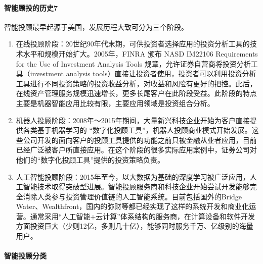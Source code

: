 \documentclass[letterpaper,11pt,english]{sphinxmanual}
\begin{document}
\begin{center}
{{\paragraph{智能顾投的历史7\sphinxfootnotemark[958]}
\label{\detokenize{chapter_AI+Finance/Robo-Advisor:id4}}%
\begin{footnotetext}[958]\sphinxAtStartFootnote
{}
%
\end{footnotetext}\ignorespaces 
智能投顾最早起源于美国，发展历程大致可分为三个阶段。
\begin{enumerate}
%
\item {} 
在线投顾阶段：20世纪90年代末期，可供投资者选择应用的投资分析工具的技术水平和规模开始扩大。2005年，FINRA
颁布 NASD IM2210\sphinxhyphen{}6 Requirements for the Use of Investment Analysis
Tools 规章，允许证券自营商将投资分析工具（investment analysis
tools）直接让投资者使用，投资者可以利用投资分析工具进行不同投资策略的投资收益分析，对收益和风险有更好的把控。此后，在线资产管理服务规模迅速增长，更多长尾客户在此阶段受益。此阶段的特点主要是机器智能应用比较有限，主要应用领域是投资组合分析。

\item {} 
机器人投顾阶段：2008年～2015年期间，大量新兴科技企业开始为客户直接提供各类基于机器学习的
“数字化投顾工具”，机器人投顾商业模式开始发展。这些公司开发的面向客户的投顾工具提供的功能之前只被金融从业者应用，目前已经广泛被客户所直接应用。在这个阶段的很多实际应用案例中，证券公司对他们的“数字化投顾工具”提供的投资策略负责。

\item {} 
人工智能投顾阶段：2015年至今，以大数据为基础的深度学习被广泛应用，人工智能技术取得突破型进展。智能投顾服务商和科技企业开始尝试开发能够完全消除人类参与投资管理价值链的人工智能系统。目前包括国外的Bridge
Water、Wealthfront，国内的弥财等都已经实现了这样的系统开发和商业化运营。通常采用“人工智能+云计算”体系结构的服务商，在计算设备和软件开发方面投资巨大（少则1\sphinxhyphen{}2亿，多则几十亿），能够同时服务千万、亿级别的海量用户。%
\begin{footnote}[959]\sphinxAtStartFootnote
{}
%
\end{footnote}

\end{enumerate}


\paragraph{智能投顾分类}
\label{\detokenize{chapter_AI+Finance/Robo-Advisor:id5}}
\begin{figure}[H]
\centering
\capstart


\end{figure}}}
\end{center}
\end{document}
